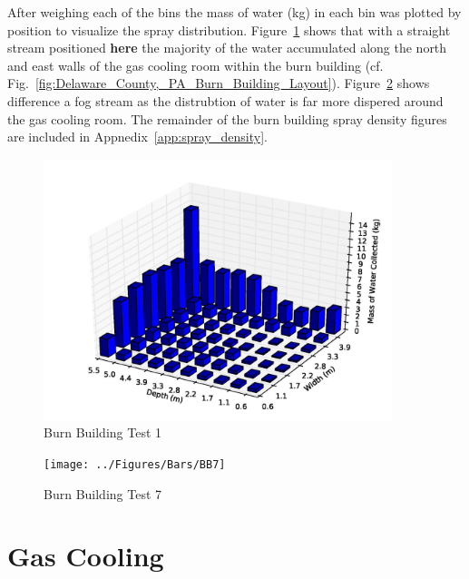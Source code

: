 \documentclass[12pt,oneside]{book}
\begin{document}
\clearpage

After weighing each of the bins the mass of water (kg) in each bin was plotted by position to visualize the spray distribution. Figure~\ref{fig:Burn_Building_Test_1} shows that with a straight stream positioned {\bf here} the majority of the water accumulated along the north and east walls of the gas cooling room within the burn building (cf. Fig.~\ref{fig:Delaware_County,_PA_Burn_Building_Layout}). Figure~\ref{fig:Burn_Building_Test_7} shows difference a fog stream as the distrubtion of water is far more dispered around the gas cooling room. The remainder of the burn building spray density figures are included in Appnedix~\ref{app:spray_density}.

\begin{figure}[!ht]
	\includegraphics[width=4in]{../Figures/Bars/BB1}
	\caption{Burn Building Test 1}
	\label{fig:Burn_Building_Test_1}
\end{figure}

\begin{figure}[!ht]
	\texttt{[image: ../Figures/Bars/BB7]}
	\caption{Burn Building Test 7}
	\label{fig:Burn_Building_Test_7}
\end{figure}


\clearpage

\section{Gas Cooling}
\label{sec:Gas_Cooling}
\end{document}
